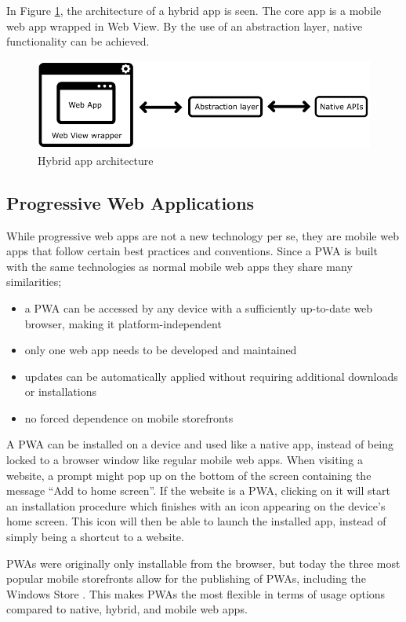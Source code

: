 \documentclass[a4paper,12pt]{article}
\begin{document}
In Figure \ref{fig:hybridapp}, the architecture of a hybrid app is seen. The core app is a mobile web app wrapped in Web View. By the use of an abstraction layer, native functionality can be achieved.

\begin{figure}[h]%
	\centering
	\includegraphics[height=3cm]{img/Other/struct_hybrid.png}
	\caption{Hybrid app architecture}%
	\label{fig:hybridapp}%
\end{figure}

\subsection{Progressive Web Applications}
\label{Theory_PWA}
While progressive web apps are not a new technology per se, they are mobile web apps that follow certain best practices and conventions. Since a PWA is built with the same technologies as normal mobile web apps they share many similarities;

\begin{itemize}
    \item a PWA can be accessed by any device with a sufficiently up-to-date web browser, making it platform-independent
    \item only one web app needs to be developed and maintained
    \item updates can be automatically applied without requiring additional downloads or installations
    \item no forced dependence on mobile storefronts
\end{itemize}

A PWA can be installed on a device and used like a native app, instead of being locked to a browser window like regular mobile web apps. When visiting a website, a prompt might pop up on the bottom of the screen containing the message “Add to home screen”. If the website is a PWA, clicking on it will start an installation procedure which finishes with an icon appearing on the device’s home screen. This icon will then be able to launch the installed app, instead of simply being a shortcut to a website.

PWAs were originally only installable from the browser, but today the three most popular mobile storefronts allow for the publishing of PWAs, including the Windows Store \cite{how_to_publish_pwa_in_stores}. This makes PWAs the most flexible in terms of usage options compared to native, hybrid, and mobile web apps.
\end{document}

